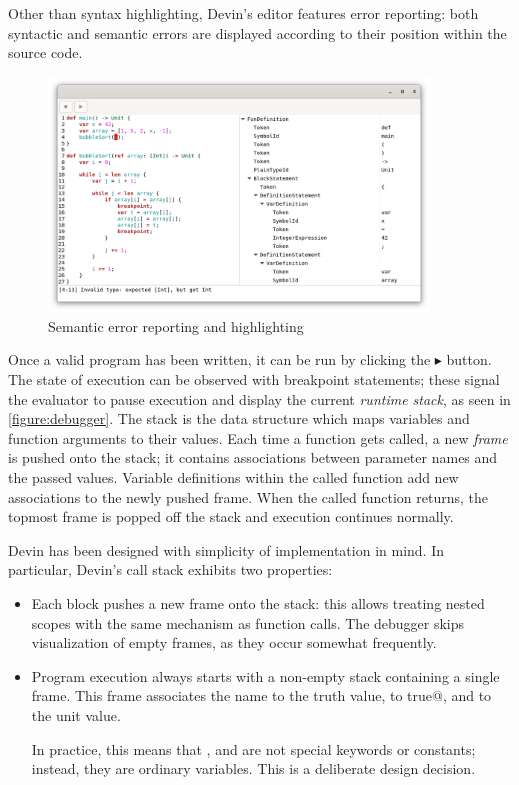 \documentclass[UdineBachThesis,american,11pt]{PhdThesis}
\begin{document}
  Other than syntax highlighting, Devin's editor features error reporting: both
  syntactic and semantic errors are displayed according to their position within
  the source code.

  \begin{figure}[h]
    \centering
    \includegraphics[width=0.9\textwidth]{4.png}
    \caption{Semantic error reporting and highlighting}
  \end{figure}

  \pagebreak

  Once a valid program has been written, it can be run by clicking the
  $\blacktriangleright$ button. The state of execution can be observed with
  breakpoint statements; these signal the evaluator to pause execution and
  display the current \emph{runtime stack}, as seen in
  \autoref{figure:debugger}. The stack is the data structure which maps
  variables and function arguments to their values. Each time a function gets
  called, a new \emph{frame} is pushed onto the stack; it contains associations
  between parameter names and the passed values. Variable definitions within the
  called function add new associations to the newly pushed frame. When the
  called function returns, the topmost frame is popped off the stack and
  execution continues normally.

  Devin has been designed with simplicity of implementation in mind. In
  particular, Devin's call stack exhibits two properties:

  \begin{itemize}
    \item Each block pushes a new frame onto the stack: this allows treating
    nested scopes with the same mechanism as function calls. The debugger skips
    visualization of empty frames, as they occur somewhat frequently.

    \item Program execution always starts with a non-empty stack containing a
    single frame. This frame associates the name \lstinline@true@ to the truth
    value, \lstinline@false@ to \lstinline@not true@, and \lstinline@unit@ to
    the unit value.

    In practice, this means that \lstinline@true@, \lstinline@false@ and
    \lstinline@unit@ are not special keywords or constants; instead, they are
    ordinary variables. This is a deliberate design decision.
  \end{itemize}
\end{document}
